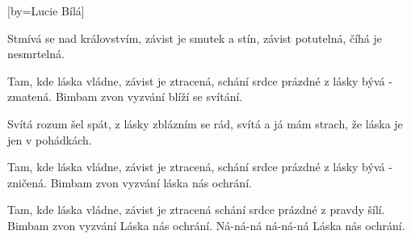 [by={Lucie Bílá}]

\beginverse{}
Stmívá se nad královstvím, závist je smutek a stín, 
závist potutelná, číhá je nesmrtelná.
\endverse{}

\beginchorus{}
Tam, kde láska vládne, závist je ztracená,
schání srdce prázdné z lásky bývá - zmatená.
Bimbam zvon vyzvání blíží se svítání.
\endchorus{}

\beginverse{}
Svítá rozum šel spát, z lásky zblázním se rád,
svítá a já mám strach, že láska je jen v pohádkách.
\endverse{}

\beginchorus{}
Tam, kde láska vládne, závist je ztracená,
schání srdce prázdné z lásky bývá - zničená.
Bimbam zvon vyzvání láska nás ochrání.
\endchorus{}

\beginverse*{}
        
\endverse{}

\beginchorus{}
Tam, kde láska vládne, závist je ztracená
schání srdce prázdné z pravdy šílí. 
Bimbam zvon vyzvání Láska nás ochrání.
Ná-ná-ná ná-ná-ná Láska nás ochrání.
\endchorus{}

\endsong{}
